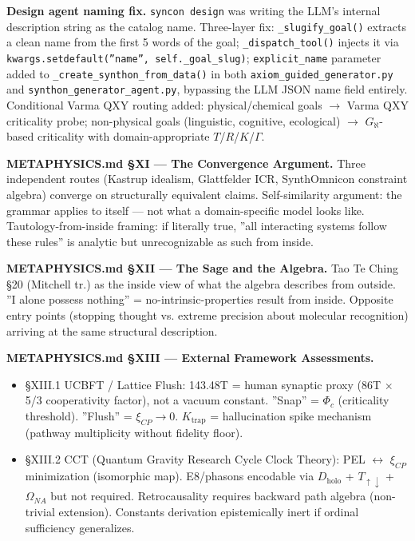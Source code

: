 \documentclass[12pt,a4paper]{article}
\begin{document}
\textbf{Design agent naming fix.} \texttt{syncon design} was writing the LLM's internal description string as the catalog name. Three-layer fix: \texttt{\_slugify\_goal()} extracts a clean name from the first 5 words of the goal; \texttt{\_dispatch\_tool()} injects it via \texttt{kwargs.setdefault(''name'', self.\_goal\_slug)}; \texttt{explicit\_name} parameter added to \texttt{\_create\_synthon\_from\_data()} in both \texttt{axiom\_guided\_generator.py} and \texttt{synthon\_generator\_agent.py}, bypassing the LLM JSON name field entirely. Conditional Varma QXY routing added: physical/chemical goals $\rightarrow$ Varma QXY criticality probe; non-physical goals (linguistic, cognitive, ecological) $\rightarrow$ $G_{\aleph}$-based criticality with domain-appropriate $T$/$R$/$K$/$\Gamma$.

\textbf{METAPHYSICS.md §XI --- The Convergence Argument.} Three independent routes (Kastrup idealism, Glattfelder ICR, SynthOmnicon constraint algebra) converge on structurally equivalent claims. Self-similarity argument: the grammar applies to itself --- not what a domain-specific model looks like. Tautology-from-inside framing: if literally true, ''all interacting systems follow these rules'' is analytic but unrecognizable as such from inside.

\textbf{METAPHYSICS.md §XII --- The Sage and the Algebra.} Tao Te Ching §20 (Mitchell tr.) as the inside view of what the algebra describes from outside. ''I alone possess nothing'' = no-intrinsic-properties result from inside. Opposite entry points (stopping thought vs. extreme precision about molecular recognition) arriving at the same structural description.

\textbf{METAPHYSICS.md §XIII --- External Framework Assessments.}

\begin{itemize}
    \item §XIII.1 UCBFT / Lattice Flush: 143.48T = human synaptic proxy (86T $\times$ 5/3 cooperativity factor), not a vacuum constant. ''Snap'' = $\Phi_c$ (criticality threshold). ''Flush'' = $\xi_{CP} \to 0$. $K_{\text{trap}}$ = hallucination spike mechanism (pathway multiplicity without fidelity floor).
    \item §XIII.2 CCT (Quantum Gravity Research Cycle Clock Theory): PEL $\leftrightarrow$ $\xi_{CP}$ minimization (isomorphic map). E8/phasons encodable via $D_{\text{holo}}$ + $T_{\uparrow\downarrow}$ + $\Omega_{NA}$ but not required. Retrocausality requires backward path algebra (non-trivial extension). Constants derivation epistemically inert if ordinal sufficiency generalizes.
\end{itemize}
\end{document}
